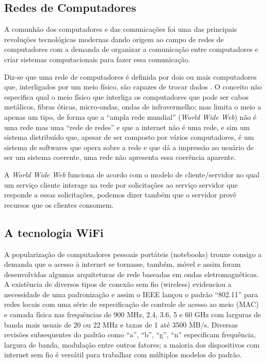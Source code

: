 \subsection{Redes de Computadores}

A comunhão dos computadores e das comunicações foi uma das principais revoluções tecnológicas modernas dando origem ao campo de redes de computadores com a demanda de organizar a comunicação entre computadores e criar sistemas computacionais para fazer essa comunicação.

Diz-se que uma rede de computadores é definida por dois ou mais computadores que, interligados por um meio físico, são capazes de trocar dados \cite{redes}. O conceito não especifica qual o meio físico que interliga os computadores que pode ser cabos metálicos, fibras óticas, micro-ondas, ondas de infravermelho; mas limita o meio a apenas um tipo, de forma que a “ampla rede mundial” (\textit{World Wide Web}) não é uma rede mas uma “rede de redes” e que a internet não é uma rede, e sim um sistema distribuído que, apesar de ser composto por vários computadores, é um sistema de softwares que opera sobre a rede e que dá a impressão ao usuário de ser um sistema coerente, uma rede não apresenta essa coerência aparente.

A \textit{World Wide Web} funciona de acordo com o modelo de cliente/servidor no qual um serviço cliente interage na rede por solicitações ao serviço servidor que responde a essas solicitações, podemos dizer também que o servidor provê recursos que os clientes consomem.

\subsection{A tecnologia \ac{WiFi}}

A popularização de computadores pessoais portáteis (notebooks) trouxe consigo a demanda que o acesso à internet se tornasse, também, móvel e assim foram desenvolvidas algumas arquiteturas de rede baseadas em ondas eletromagnéticas. A existência de diversos tipos de conexão sem fio (wireless) evidenciou a necessidade de uma padronização e assim o \ac{IEEE} lançou o padrão “802.11” para redes locais \cite{wifi} com uma série de especificação de controle de acesso ao meio (MAC) e camada física nas frequências de 900 MHz, 2.4, 3.6, 5 e 60 GHz com larguras de banda mais usuais de 20 ou 22 MHz e taxas de 1 até 3500 MB/s. Diversas revisões subsequentes do padrão como “a”, “b”, “g”, “n” especificam frequência, largura de banda, modulação entre outros fatores; a maioria dos dispositivos com internet sem fio é versátil para trabalhar com múltiplos modelos do padrão.

